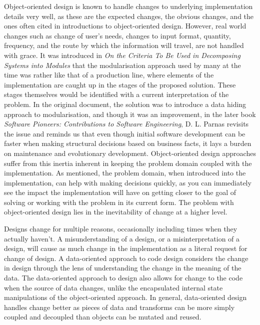 \documentclass[a4paper,12pt]{article}
\begin{document}
Object-oriented design is known to handle changes to underlying implementation details very well, as these are the expected changes, the obvious changes, and the ones often cited in introductions to object-oriented design.
However, real world changes such as change of user's needs, changes to input format, quantity, frequency, and the route by which the information will travel, are not handled with grace.
It was introduced in \textit{On the Criteria To Be Used in Decomposing Systems into Modules} that the modularisation approach used by many at the time was rather like that of a production line, where elements of the implementation are caught up in the stages of the proposed solution.
These stages themselves would be identified with a current interpretation of the problem.
In the original document, the solution was to introduce a data hiding approach to modularisation, and though it was an improvement, in the later book \textit{Software Pioneers: Contributions to Software Engineering}, D. L. Parnas revisits the issue and reminds us that even though initial software development can be faster when making structural decisions based on business facts, it lays a burden on maintenance and evolutionary development.
Object-oriented design approaches suffer from this inertia inherent in keeping the problem domain coupled with the implementation.
As mentioned, the problem domain, when introduced into the implementation, can help with making decisions quickly, as you can immediately see the impact the implementation will have on getting closer to the goal of solving or working with the problem in its current form.
The problem with object-oriented design lies in the inevitability of change at a higher level.

Designs change for multiple reasons, occasionally including times when they actually haven't.
A misunderstanding of a design, or a misinterpretation of a design, will cause as much change in the implementation as a literal request for change of design.
A data-oriented approach to code design considers the change in design through the lens of understanding the change in the meaning of the data.
The data-oriented approach to design also allows for change to the code when the source of data changes, unlike the encapsulated internal state manipulations of the object-oriented approach.
In general, data-oriented design handles change better as pieces of data and transforms can be more simply coupled and decoupled than objects can be mutated and reused.
\end{document}
